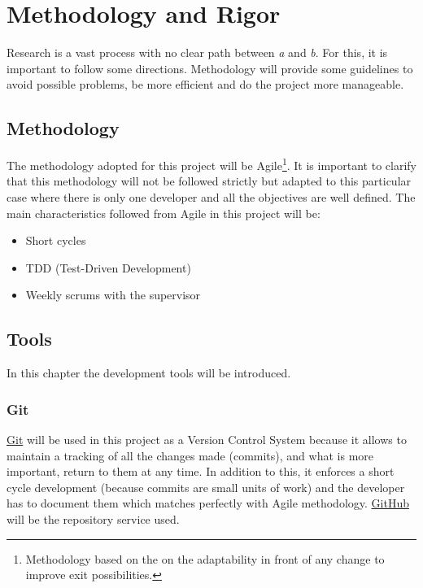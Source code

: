 \chapter{Methodology and Rigor} %

\label{Chapter4} %

Research is a vast process with no clear path between \emph{a} and \emph{b}. For this, it is important to follow some directions. Methodology will provide some guidelines to avoid possible problems, be more efficient and do the project more manageable. 

\section{Methodology}
The methodology adopted for this project will be Agile\footnote{Methodology based on the on the adaptability in front of any change to improve exit possibilities.}. It is important to clarify that this methodology will not be followed strictly but adapted to this particular case where there is only one developer and all the objectives are well defined. The main characteristics followed from Agile in this project will be:
\begin{itemize}
	\item Short cycles
	\item TDD (Test-Driven Development)
	\item Weekly scrums with the supervisor
\end{itemize}

\section{Tools}
In this chapter the development tools will be introduced. 
\subsection{Git}
\href{https://git-scm.com/}{Git} will be used in this project as a Version Control System because it allows to maintain a tracking of all the changes made (commits), and what is more important, return to them at any time. In addition to this, it enforces a short cycle development (because commits are small units of work) and the developer has to document them which matches perfectly with Agile methodology. \href{https://github.com}{GitHub} will be the repository service used.
